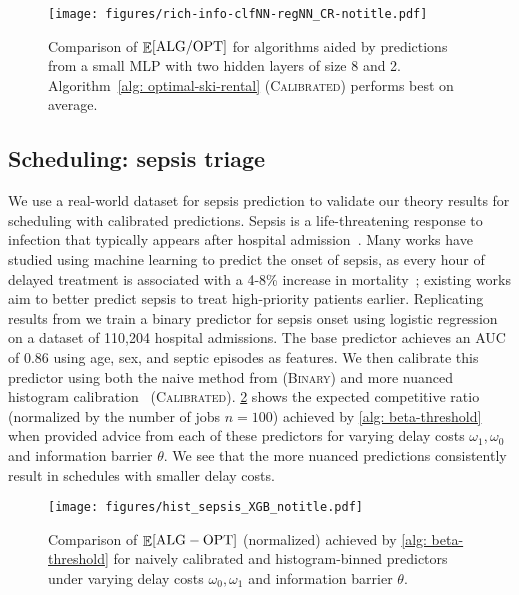 \begin{figure}[tb]
    \centering
    \texttt{[image: figures/rich-info-clfNN-regNN\_CR-notitle.pdf]}
    \caption{Comparison of $\mathop{\mathbb{E}}[\textnormal{ALG}/\textnormal{OPT}]$ for algorithms aided by predictions from a small MLP with two hidden layers of size 8 and 2. Algorithm~\ref{alg: optimal-ski-rental} (\textsc{Calibrated}) performs best on average.}
    \label{fig:ski-rental-main}
\end{figure}

\subsection{Scheduling: sepsis triage}
We use a real-world dataset for sepsis prediction to validate our theory results for scheduling with calibrated predictions. Sepsis is a life-threatening response to infection that typically appears after hospital admission~\citep{singer2016third}. Many works have studied using machine learning to predict the onset of sepsis, as every hour of delayed treatment is associated with a 4-8\% increase in mortality~\citep{kumar2006duration, reyna2020early}; existing works aim to better predict sepsis to treat high-priority patients earlier. Replicating results from \citet{chicco2020survival} we train a binary predictor for sepsis onset using logistic regression on a dataset of 110,204 hospital admissions. The base predictor achieves an AUC of 0.86 using age, sex, and septic episodes as features. We then calibrate this predictor using both the naive method from \citet{Cho22:Scheduling} (\textsc{Binary}) and more nuanced histogram calibration~\citep{zadrozny2001obtaining} (\textsc{Calibrated}). \cref{fig:schedule-cr} shows the expected competitive ratio (normalized by the number of jobs $n=100$) achieved by \cref{alg: beta-threshold} when provided advice from each of these predictors for varying delay costs $\omega_1, \omega_0$ and information barrier $\theta$. We see that the more nuanced predictions consistently result in schedules with smaller delay costs.

\begin{figure}[tb]
    \centering
    \texttt{[image: figures/hist\_sepsis\_XGB\_notitle.pdf]}
    \caption{Comparison of $\mathop{\mathbb{E}}[\textnormal{ALG}-\textnormal{OPT}]$ (normalized) achieved by \cref{alg: beta-threshold} for naively calibrated and histogram-binned predictors under varying delay costs $\omega_0, \omega_1$ and information barrier $\theta$.}
    \label{fig:schedule-cr}
\end{figure}

